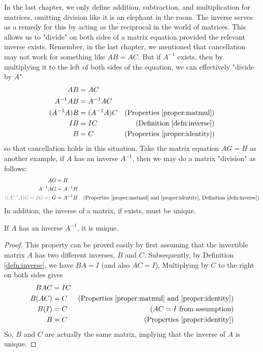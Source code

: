 In the last chapter, we only define addition, subtraction, and multiplication for matrices, omitting division like it is an elephant in the room. The inverse serves as a remedy for this by acting as the reciprocal in the world of matrices. This allows us to "divide" on both sides of a matrix equation provided the relevant inverse exists. Remember, in the last chapter, we mentioned that cancellation may not work for something like $AB = AC$. But if $A^{-1}$ exists, then by multiplying it to the left of both sides of the equation, we can effectively "divide by $A$" 
\begin{align*}
AB &= AC \\
A^{-1}AB &= A^{-1}AC \\
(A^{-1}A)B &= (A^{-1}A)C & \text{(Properties \ref{proper:matmul})} \\
IB &= IC & \text{(Definition \ref{defn:inverse})} \\
B &= C & \text{(Properties \ref{proper:identity})}
\end{align*}
so that cancellation holds in this situation. Take the matrix equation $AG = H$ as another example, if $A$ has an inverse $A^{-1}$, then we may do a matrix "division" as follows:
\begin{align*}
AG &= H \\
A^{-1}AG &= A^{-1}H \\
\textcolor{gray}{((A^{-1}A)G = IG =)} \; G &= A^{-1}H & 
\text{(Properties \ref{proper:matmul} and \ref{proper:identity}, Definition \ref{defn:inverse})}
\end{align*}
In addition, the inverse of a matrix, if exists, must be unique.
\begin{proper}
\label{proper:uniqueinverse}
If $A$ has an inverse $A^{-1}$, it is unique.
\end{proper}
\begin{proof}
This property can be proved easily by first assuming that the invertible matrix $A$ has two different inverses, $B$ and $C$. Subsequently, by Definition \ref{defn:inverse}, we have $BA = I$ (and also $AC = I$). Multiplying by $C$ to the right on both sides gives
\begin{align*}
BAC &= IC \\
B(AC) &= C & \text{(Properties \ref{proper:matmul} and \ref{proper:identity})}\\
B(I) &= C & \text{($AC = I$ from assumption)} \\
B &= C & \text{(Properties \ref{proper:identity})}
\end{align*}
So, $B$ and $C$ are actually the same matrix, implying that the inverse of $A$ is unique.    
\end{proof}
